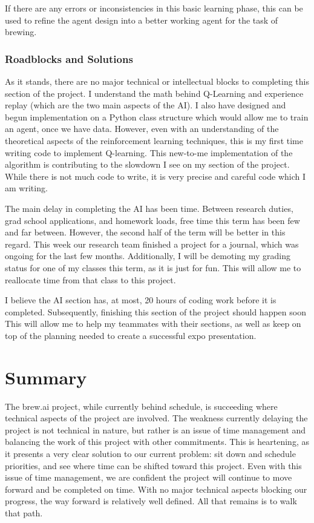 \documentclass[draftclsnofoot,onecolumn,letterpaper,10pt]{IEEEtran}
\begin{document}
If there are any errors or inconsistencies in this basic learning phase, this can be used to refine the agent design into a better working agent for the task of brewing.

\subsubsection{Roadblocks and Solutions}
As it stands, there are no major technical or intellectual blocks to completing this section of the project.
I understand the math behind Q-Learning and experience replay (which are the two main aspects of the AI).
I also have designed and begun implementation on a Python class structure which would allow me to train an agent, once we have data.
However, even with an understanding of the theoretical aspects of the reinforcement learning techniques, this is my first time writing code to implement Q-learning.
This new-to-me implementation of the algorithm is contributing to the slowdown I see on my section of the project.
While there is not much code to write, it is very precise and careful code which I am writing.

The main delay in completing the AI has been time.
Between research duties, grad school applications, and homework loads, free time this term has been few and far between.
However, the second half of the term will be better in this regard. This week our research team finished a project for a journal, which was ongoing for the last few months.
Additionally, I will be demoting my grading status for one of my classes this term, as it is just for fun.
This will allow me to reallocate time from that class to this project.

I believe the AI section has, at most, 20 hours of coding work before it is completed.
Subsequently, finishing this section of the project should happen soon
This will allow me to help my teammates with their sections, as well as keep on top of the planning needed to create a successful expo presentation.


\section{Summary}
The brew.ai project, while currently behind schedule, is succeeding where technical aspects of the project are involved.
The weakness currently delaying the project is not technical in nature, but rather is an issue of time management and balancing the work of this project with other commitments.
This is heartening, as it presents a very clear solution to our current problem: sit down and schedule priorities, and see where time can be shifted toward this project.
Even with this issue of time management, we are confident the project will continue to move forward and be completed on time.
With no major technical aspects blocking our progress, the way forward is relatively well defined. All that remains is to walk that path.
\end{document}
